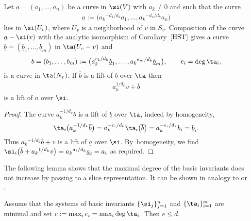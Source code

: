 \begin{Lemma} \label{lem:red}
 Let $a=(a_1,\dots,a_n)$ be a curve in $\si(V)$ with $a_k \ne 0$ and such that the curve
 \begin{gather*}
 \underline a := \big({a_k}^{-d_1/d_k} a_1,\dots,{a_k}^{-d_n/d_k} a_n\big)
 \end{gather*}
 lies in $\si(U_v)$, where $U_v$ is a neighborhood of $v$ in $S_v$.
 Composition of the curve $\underline a -\si(v)$ with the analytic isomorphism of Corollary~$\ref{HST}$ gives a
 curve $\underline b = (\underline b_1,\dots,\underline b_m)$ in $\ta(U_v-v)$ and
 \begin{gather*}
 b = (b_1,\dots,b_m)
 := \big(a_k^{e_1/d_k} \underline b_1,\dots,{a_k}^{e_m/d_k} \underline b_m\big),
 \qquad e_i = \deg \ta_i,
 \end{gather*}
 is a curve in $\ta(N_v)$. If $\overline b$ is a lift of $b$ over $\ta$ then
 \begin{gather*} %
 a_k^{1/d_k} v + \overline b
 \end{gather*}
 is a lift of $a$ over $\si$.
\end{Lemma}

\begin{proof}
 The curve $a_k^{-1/d_k} \overline b$ is a lift of $\underline b$ over $\ta$, indeed by homogeneity,
 \begin{gather*}
 \ta_i\big(a_k^{-1/d_k} \overline b\big) = a_k^{-e_i/d_k} \ta_i\big(\overline b\big)
 = a_k^{-e_i/d_k} b_i = \underline b_i.
 \end{gather*}
 Thus ${a_k}^{-1/d_k} \overline b + v$ is a lift of $\underline a$ over $\si$. By~homogeneity, we find $\si_i\big(\overline b + {a_k}^{1/d_k} v\big) = {a_k}^{d_i/d_k} \underline a_i = a_i$
 as required.
\end{proof}


The following lemma shows that the maximal degree of the basic invariants does not increase by
passing to a slice representation. It can be shown in analogy to \cite[Lemma 2.4]{KLMR06} or \cite{ParusinskiRainer14}.

\begin{Lemma} \label{lem:e}
 Assume that the systems of basic invariants $\{\si_j\}_{j=1}^n$ and $\{\ta_i\}_{i=1}^m$ are minimal and
 set $e := \max_{i} e_i = \max_{i} \deg \ta_i$. Then $e \le d$.
\end{Lemma}

